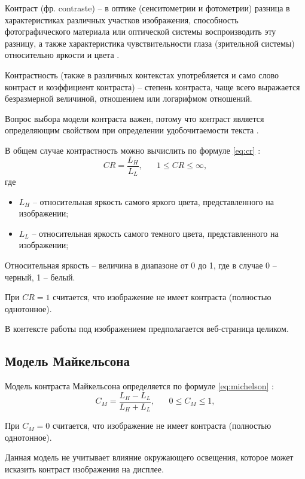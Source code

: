 Контраст (фр. contraste) -- в оптике (сенситометрии и фотометрии) разница в характеристиках различных участков изображения, способность фотографического материала или оптической системы воспроизводить эту разницу, а также характеристика чувствительности глаза (зрительной системы) относительно яркости и цвета \cite{contrast}.

Контрастность (также в различных контекстах употребляется и само слово контраст и коэффициент контраста) -- степень контраста, чаще всего выражается безразмерной величиной, отношением или логарифмом отношений.

Вопрос выбора модели контраста важен, потому что контраст является определяющим свойством при определении удобочитаемости текста \cite{wcag1}.

В общем случае контрастность можно вычислить по формуле \ref{eq:cr} \cite{weber}:
\begin{equation}
	\label{eq:cr}
	CR=\frac{L_H}{L_L}, \text{~~~~~$1 \le CR \le \infty$},
\end{equation}
где
\begin{itemize}
	\item $L_H$ -- относительная яркость \cite{relativeluminance} самого яркого цвета, представленного на изображении;
	\item $L_L$ -- относительная яркость самого темного цвета, представленного на изображении;
\end{itemize}

Относительная яркость -- величина в диапазоне от 0 до 1, где в случае 0 -- черный, 1 -- белый.

При $CR = 1$ считается, что изображение не имеет контраста (полностью однотонное).

В контексте работы под изображением предполагается веб-страница целиком.

\subsection{Модель Майкельсона}

Модель контраста Майкельсона определяется по формуле \ref{eq:michelson} \cite{weber}:
\begin{equation}
	\label{eq:michelson}
	C_M=\frac{L_H-L_L}{L_H+L_L}, \text{~~~~~$0 \le C_M \le 1$},
\end{equation}

При $C_M = 0$ считается, что изображение не имеет контраста (полностью однотонное).

Данная модель не учитывает влияние окружающего освещения, которое может исказить контраст изображения на дисплее.

